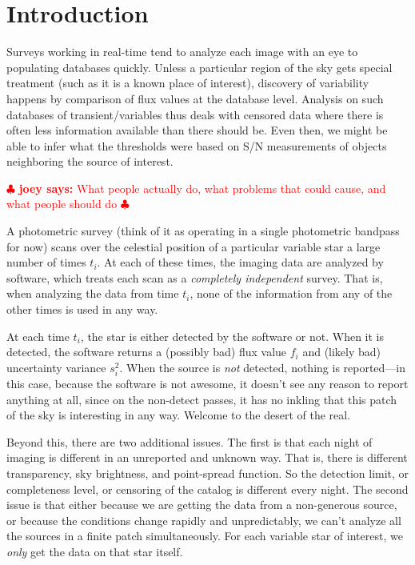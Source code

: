 \documentclass[12pt,preprint]{aastex}
\newcommand{\joey}[1] { \textcolor{red} {
\ensuremath{\clubsuit} {\bf joey says:}  {#1}
\ensuremath{\clubsuit} } }%
\begin{document}

\section{Introduction}
\label{sec:intro}



Surveys working in real-time tend to analyze each image with an eye to populating databases quickly. Unless a particular region of the sky gets special treatment (such as it is a known place of interest), discovery of variability happens by comparison of flux values at the database level. Analysis on such databases of transient/variables thus deals with censored data where there is often less information available than there should be. Even then, we might be able to infer what the thresholds were based on S/N measurements of objects neighboring the source of interest.


\joey{What people actually do, what problems that could cause, and what people should do}

A photometric survey (think of it as operating in a single photometric
bandpass for now) scans over the celestial position of a particular
variable star  a large number of times $t_i$.  At each of these
times, the imaging data are analyzed by software, which
treats each scan as a \emph{completely independent} survey.  That is,
when analyzing the data from time $t_i$, none of the information from
any of the other times is used in any way.




At each time $t_i$, the star is either detected by the
software or not.  When it is detected, the software returns
a (possibly bad) flux value $f_i$ and (likely bad) uncertainty
variance $s_i^2$.  When the source is \emph{not} detected,
nothing is reported---in this case, because the software is not
awesome, it doesn't see any reason to report anything at all, since on
the non-detect passes, it has no inkling that this patch of the sky is
interesting in any way.  Welcome to the desert of the real.

Beyond this, there are two additional issues.  The first is that each
night of imaging is different in an unreported and unknown way.  That
is, there is different transparency, sky brightness, and point-spread
function.  So the detection limit, or completeness level, or censoring
of the catalog is different every night.  The second issue is that
either because we are getting the data from a non-generous source, or
because the conditions change rapidly and unpredictably, we can't
analyze all the sources in a finite patch simultaneously.  For each
variable star of interest, we \emph{only} get the data on that star
itself.
\end{document}
